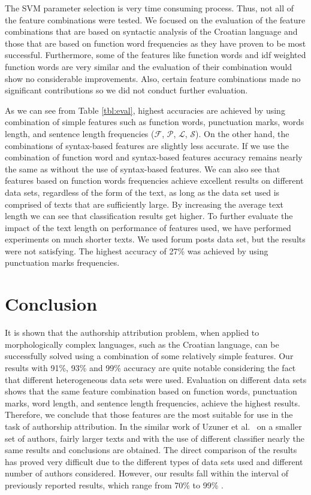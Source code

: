 \documentclass{llncs}
\begin{document}
The SVM parameter selection is very time consuming process. Thus, not all of the
feature combinations were tested. We focused on the evaluation of the feature
combinations that are based on syntactic analysis of the Croatian language and
those that are based on function word frequencies as they have proven to be most
successful. Furthermore, some of the features like function words and idf
weighted function words are very similar and the evaluation of their combination
would show no considerable improvements. Also, certain feature combinations made
no significant contributions so we did not conduct further evaluation.

As we can see from Table \ref{tbl:eval}, highest accuracies are achieved by
using combination of simple features such as function words, punctuation marks,
words length, and sentence length frequencies ($\mathcal{F}$, $\mathcal{P}$, $\mathcal{L}$, $\mathcal{S}$). On the other hand, the combinations of syntax-based features are slightly less accurate. If we use the combination of function word and syntax-based features accuracy remains nearly the same as without the use of syntax-based features. We can also see that features based on function words frequencies achieve excellent results on different data sets, regardless
of the form of the text, as long as the data set used is comprised of texts that
are sufficiently large. By increasing the average text length we can see that
classification results get higher. To further evaluate the impact of the text
length on performance of features used, we have performed experiments on much
shorter texts. We used forum posts data set, but the results were not satisfying.
The highest accuracy of 27\% was achieved by using punctuation marks frequencies.

\section{Conclusion}
It is shown that the authorship attribution problem, when applied to
morphologically complex languages, such as the Croatian language, can be
successfully solved using a combination of some relatively simple features. Our
results with 91\%, 93\% and 99\% accuracy are quite notable considering the fact
that different heterogeneous data sets were used. Evaluation on different data
sets shows that the same feature combination based on function words,
punctuation marks, word length, and sentence length frequencies, achieve the
highest results. Therefore, we conclude that those
features are the most suitable for use in the task of authorship
attribution. In the similar work of Uzuner et al.\ \cite{uzuner2005comparative}
on a smaller set of authors, fairly larger texts and with the use of
different classifier nearly the same results and conclusions are obtained. The
direct comparison of the results has proved very difficult due to the different types of data sets
used  and different number of authors considered. However, our results fall
within the interval of previously reported results, which range from 70\% to 99\%
\cite{argamon2005measuring,coyotl2006authorship,keselj2003n,luyckx2005shallow,stamatatos2001computer,uzuner2005comparative}.
\end{document}
